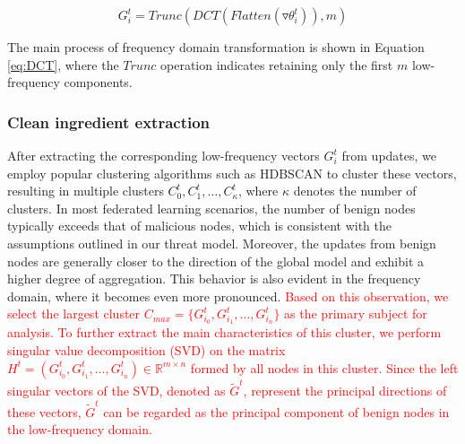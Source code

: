 \documentclass[lettersize,journal]{IEEEtran}
\begin{document}
\begin{equation}
G_i^t = Trunc(DCT(Flatten(\triangledown \theta_i^t)), m)
\label{eq:DCT}
\end{equation}

The main process of frequency domain transformation is shown in Equation \ref{eq:DCT}, where the $Trunc$ operation indicates retaining only the first $m$ low-frequency components.

\subsubsection{Clean ingredient extraction}
After extracting the corresponding low-frequency vectors \(G_i^t\) from updates, we employ popular clustering algorithms such as HDBSCAN \cite{mcinnes2017hdbscan} to cluster these vectors, resulting in multiple clusters \(C_0^t, C_1^t, \ldots, C_{\kappa}^t\), where \(\kappa\) denotes the number of clusters. In most federated learning scenarios, the number of benign nodes typically exceeds that of malicious nodes, which is consistent with the assumptions outlined in our threat model. Moreover, the updates from benign nodes are generally closer to the direction of the global model and exhibit a higher degree of aggregation. This behavior is also evident in the frequency domain, where it becomes even more pronounced. 
\textcolor{red}{Based on this observation, we select the largest cluster \(C_{max} = \{G^t_{i_0}, G^t_{i_1}, \ldots, G^t_{i_n}\}\) as the primary subject for analysis. To further extract the main characteristics of this cluster, we perform singular value decomposition (SVD)\cite{wang2023scfl} on the matrix $H^t = (G^t_{i_0}, G^t_{i_1}, \ldots, G^t_{i_n}) \in \mathbb{R}^{m \times n}$ formed by all nodes in this cluster. Since the left singular vectors of the SVD, denoted as \(\tilde{G}^t\), represent the principal directions of these vectors, \(\tilde{G}^t\) can be regarded as the principal component of benign nodes in the low-frequency domain.}
\end{document}
